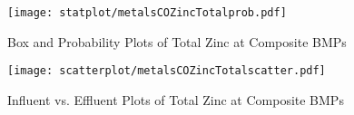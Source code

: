         \begin{figure}[hb]   %
            \centering
            \texttt{[image: statplot/metalsCOZincTotalprob.pdf]}
            \caption{Box and Probability Plots of Total Zinc at Composite BMPs}
        \end{figure}         %
        
        
        \begin{figure}[hb]   %
            \centering
            \texttt{[image: scatterplot/metalsCOZincTotalscatter.pdf]}
            \caption{Influent vs. Effluent Plots of Total Zinc at Composite BMPs}
        \end{figure}         %
        \clearpage
        